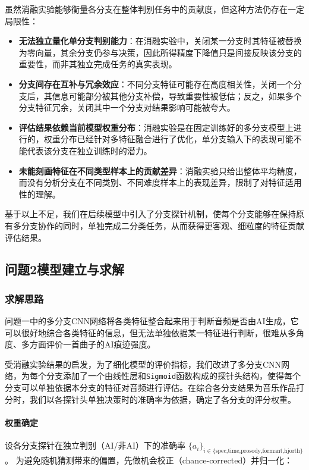 \documentclass[a4paper,12pt]{article}
\begin{document}
虽然消融实验能够衡量各分支在整体判别任务中的贡献度，但这种方法仍存在一定局限性：  
\begin{itemize}
  \item \textbf{无法独立量化单分支判别能力}：在消融实验中，关闭某一分支时其特征被替换为零向量，其余分支仍参与决策，因此所得精度下降值只是间接反映该分支的重要性，而非其独立完成任务的真实表现。  
  \item \textbf{分支间存在互补与冗余效应}：不同分支特征可能存在高度相关性，关闭一个分支后，其信息可能部分被其他分支补偿，导致重要性被低估；反之，如果多个分支特征冗余，关闭其中一个分支对结果影响可能被夸大。  
  \item \textbf{评估结果依赖当前模型权重分布}：消融实验是在固定训练好的多分支模型上进行的，权重分布已经针对多特征融合进行了优化，单分支输入下的表现可能不能代表该分支在独立训练时的潜力。  
  \item \textbf{未能刻画特征在不同类型样本上的贡献差异}：消融实验只给出整体平均精度，而没有分析分支在不同类别、不同难度样本上的表现差异，限制了对特征适用性的理解。  
\end{itemize}
基于以上不足，我们在后续模型中引入了分支探针机制，使每个分支能够在保持原有多分支协作的同时，单独完成二分类任务，从而获得更客观、细粒度的特征贡献评估结果。


\subsection{问题2模型建立与求解}
\subsubsection{求解思路}
问题一中的多分支CNN网络将各类特征整合起来用于判断音频是否由AI生成，它可以很好地综合各类特征的信息，但无法单独依据某一特征进行判断，很难从多角度、多方面评价一首曲子的AI痕迹强度。

受消融实验结果的启发，为了细化模型的评价指标，我们改进了多分支CNN网络，为每个分支添加了一个由线性层和\texttt{Sigmoid}函数构成的探针头结构，使得每个分支可以单独依据本分支的特征对音频进行评估。在综合各分支结果为音乐作品打分时，我们以各探针头单独决策时的准确率为依据，确定了各分支的评分权重。

\paragraph{权重确定} 设各分支探针在独立判别（AI/非AI）下的准确率
$\{a_i\}_{i\in\{\text{spec,time,prosody,formant,hjorth}\}}$。
为避免随机猜测带来的偏置，先做机会校正（chance-corrected）并归一化：
\end{document}

